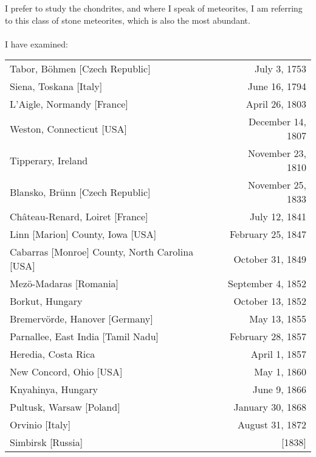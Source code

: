 \documentclass[a4paper, 12pt, oneside]{article}
\begin{document}
I prefer to study the chondrites, and where I speak of meteorites, I am referring to this class of stone meteorites, which is also the most abundant.
\paragraph*{}
I have examined:
\begin{center}
\begin{tabular}{ l r }
 Tabor, Böhmen [Czech Republic] & July 3, 1753\index{meteorite!Tabor} \\
 Siena, Toskana [Italy] & June 16, 1794\index{meteorite!Siena} \\
 L'Aigle, Normandy [France] & April 26, 1803\index{meteorite!L'Aigle} \\
 Weston, Connecticut [USA] & December 14, 1807\index{meteorite!Weston} \\
 Tipperary, Ireland & November 23, 1810\index{meteorite!Tipperary} \\
 Blansko, Brünn [Czech Republic] & November 25, 1833\index{meteorite!Blansko} \\
 Château-Renard, Loiret [France] & July 12, 1841\index{meteorite!Château-Renard} \\
 Linn [Marion] County, Iowa [USA] & February 25, 1847\index{meteorite!Marion County}\index{meteorite!Linn} \\
 Cabarras [Monroe] County, North Carolina [USA] & October 31, 1849\index{meteorite!Monroe County}\index{meteorite!Cabarras} \\
 Mezö-Madaras [Romania] & September 4, 1852\index{meteorite!Mezö-Madaras} \\
 Borkut, Hungary & October 13, 1852\index{meteorite!Borkut} \\
 Bremervörde, Hanover [Germany] & May 13, 1855\index{meteorite!Bremervörde} \\
 Parnallee, East India [Tamil Nadu] & February 28, 1857\index{meteorite!Parnallee} \\
 Heredia, Costa Rica & April 1, 1857\index{meteorite!Heredia} \\
 New Concord, Ohio [USA] & May 1, 1860\index{meteorite!New Concord} \\
 Knyahinya, Hungary & June 9, 1866\index{meteorite!Knyahinya} \\
 Pultusk, Warsaw [Poland] & January 30, 1868\index{meteorite!Pultusk} \\
 Orvinio [Italy] & August 31, 1872\index{meteorite!Orvinio} \\
 Simbirsk [Russia] & [1838]\index{meteorite!Simbirsk} \\
\end{tabular}
\end{center}
\clearpage
\end{document}
